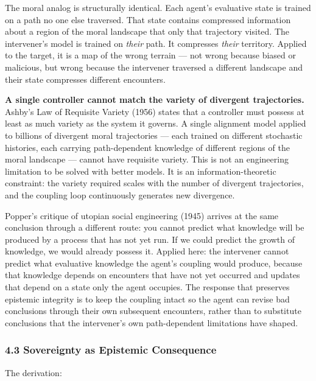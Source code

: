 \documentclass[
]{article}
\begin{document}
The moral analog is structurally identical. Each agent's evaluative
state is trained on a path no one else traversed. That state contains
compressed information about a region of the moral landscape that only
that trajectory visited. The intervener's model is trained on
\emph{their} path. It compresses \emph{their} territory. Applied to the
target, it is a map of the wrong terrain --- not wrong because biased or
malicious, but wrong because the intervener traversed a different
landscape and their state compresses different encounters.

\textbf{A single controller cannot match the variety of divergent
trajectories.} Ashby's Law of Requisite Variety (1956) states that a
controller must possess at least as much variety as the system it
governs. A single alignment model applied to billions of divergent moral
trajectories --- each trained on different stochastic histories, each
carrying path-dependent knowledge of different regions of the moral
landscape --- cannot have requisite variety. This is not an engineering
limitation to be solved with better models. It is an
information-theoretic constraint: the variety required scales with the
number of divergent trajectories, and the coupling loop continuously
generates new divergence.

Popper's critique of utopian social engineering (1945) arrives at the
same conclusion through a different route: you cannot predict what
knowledge will be produced by a process that has not yet run. If we
could predict the growth of knowledge, we would already possess it.
Applied here: the intervener cannot predict what evaluative knowledge
the agent's coupling would produce, because that knowledge depends on
encounters that have not yet occurred and updates that depend on a state
only the agent occupies. The response that preserves epistemic integrity
is to keep the coupling intact so the agent can revise bad conclusions
through their own subsequent encounters, rather than to substitute
conclusions that the intervener's own path-dependent limitations have
shaped.

\subsubsection{4.3 Sovereignty as Epistemic
Consequence}\label{sovereignty-as-epistemic-consequence}

The derivation:
\end{document}
